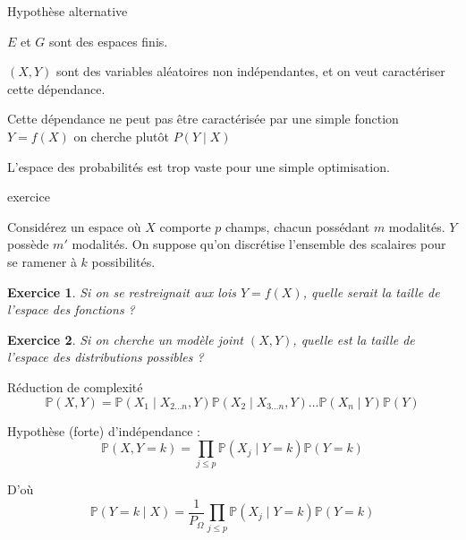 \documentclass[11pt]{beamer}
\newtheorem{exercice}{Exercice}
\begin{document}
\begin{frame}{Hypothèse alternative}

$E$ et $G$ sont des espaces finis.\\

\vspace{0.2cm}

$(X,Y)$ sont des variables aléatoires non indépendantes, et on veut caractériser cette dépendance.\\

\pause

\vspace{0.2cm}

Cette dépendance ne peut pas être caractérisée par une simple fonction $Y=f(X)$ on cherche plutôt $P(Y\mid X)$

\vspace{0.3cm}

L'espace des probabilités est trop vaste pour une simple optimisation.

\end{frame}

\begin{frame}{exercice}

Considérez un espace où $X$ comporte $p$ champs, chacun possédant $m$ modalités. $Y$ possède $m'$ modalités. On suppose qu'on discrétise l'ensemble des scalaires pour se ramener à $k$ possibilités.

\begin{exercice}
Si on se restreignait aux lois $Y=f(X)$, quelle serait la taille de l'espace des fonctions ?
\end{exercice}

\begin{exercice}
Si on cherche un modèle joint $(X,Y)$, quelle est la taille de l'espace des distributions possibles ? 
\end{exercice}

\end{frame}

\begin{frame}{Réduction de complexité}
$$\mathbb{P}(X,Y) = \mathbb{P}(X_1\mid X_{2\ldots n},Y)\mathbb{P}(X_2\mid X_{3\ldots n},Y)
\ldots\mathbb{P}(X_n\mid Y)\mathbb{P}(Y)$$

\pause 

Hypothèse (forte) d'indépendance :
$$\mathbb{P}(X,Y=k) = \prod_{j \leq p}\mathbb{P}(X_j\mid Y=k)\mathbb{P}(Y=k)$$

D'où
$$\mathbb{P}(Y=k\mid X) = \frac{1}{P_{\Omega}} \prod_{j \leq p}\mathbb{P}(X_j\mid Y=k)\mathbb{P}(Y=k)$$

\end{frame}
\end{document}
